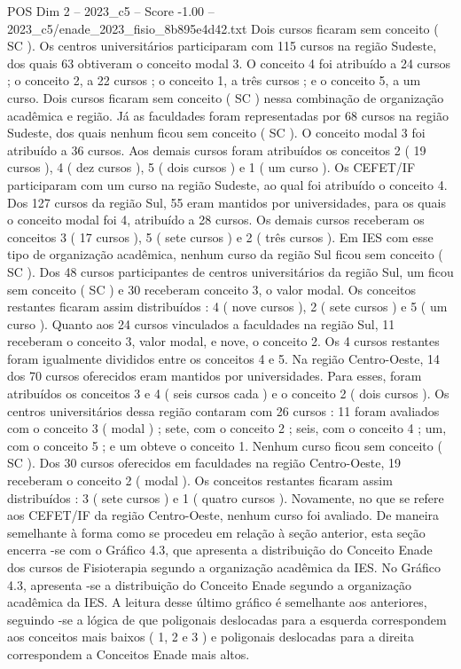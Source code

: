 \begin{textsample}{POS Dim 2 – 2023\_c5 – Score -1.00 – 2023\_c5/enade\_2023\_fisio\_8b895e4d42.txt}
Dois cursos ficaram sem conceito ( SC ).
Os centros universitários participaram com 115 cursos na região Sudeste, dos quais 63 obtiveram o conceito modal 3.
O conceito 4 foi atribuído a 24 cursos ; o conceito 2, a 22 cursos ; o conceito 1, a três cursos ; e o conceito 5, a um curso.
Dois cursos ficaram sem conceito ( SC ) nessa combinação de organização acadêmica e região.
Já as faculdades foram representadas por 68 cursos na região Sudeste, dos quais nenhum ficou sem conceito ( SC ).
O conceito modal 3 foi atribuído a 36 cursos.
Aos demais cursos foram atribuídos os conceitos 2 ( 19 cursos ), 4 ( dez cursos ), 5 ( dois cursos ) e 1 ( um curso ).
Os CEFET/IF participaram com um curso na região Sudeste, ao qual foi atribuído o conceito 4.
Dos 127 cursos da região Sul, 55 eram mantidos por universidades, para os quais o conceito modal foi 4, atribuído a 28 cursos.
Os demais cursos receberam os conceitos 3 ( 17 cursos ), 5 ( sete cursos ) e 2 ( três cursos ).
Em IES com esse tipo de organização acadêmica, nenhum curso da região Sul ficou sem conceito ( SC ).
Dos 48 cursos participantes de centros universitários da região Sul, um ficou sem conceito ( SC ) e 30 receberam conceito 3, o valor modal.
Os conceitos restantes ficaram assim distribuídos : 4 ( nove cursos ), 2 ( sete cursos ) e 5 ( um curso ).
Quanto aos 24 cursos vinculados a faculdades na região Sul, 11 receberam o conceito 3, valor modal, e nove, o conceito 2.
Os 4 cursos restantes foram igualmente divididos entre os conceitos 4 e 5.
Na região Centro-Oeste, 14 dos 70 cursos oferecidos eram mantidos por universidades.
Para esses, foram atribuídos os conceitos 3 e 4 ( seis cursos cada ) e o conceito 2 ( dois cursos ).
Os centros universitários dessa região contaram com 26 cursos : 11 foram avaliados com o conceito 3 ( modal ) ; sete, com o conceito 2 ; seis, com o conceito 4 ; um, com o conceito 5 ; e um obteve o conceito 1.
Nenhum curso ficou sem conceito ( SC ).
Dos 30 cursos oferecidos em faculdades na região Centro-Oeste, 19 receberam o conceito 2 ( modal ).
Os conceitos restantes ficaram assim distribuídos : 3 ( sete cursos ) e 1 ( quatro cursos ).
Novamente, no que se refere aos CEFET/IF da região Centro-Oeste, nenhum curso foi avaliado.
De maneira semelhante à forma como se procedeu em relação à seção anterior, esta seção encerra -se com o Gráfico 4.3, que apresenta a distribuição do Conceito Enade dos cursos de Fisioterapia segundo a organização acadêmica da IES.
No Gráfico 4.3, apresenta -se a distribuição do Conceito Enade segundo a organização acadêmica da IES.
A leitura desse último gráfico é semelhante aos anteriores, seguindo -se a lógica de que poligonais deslocadas para a esquerda correspondem aos conceitos mais baixos ( 1, 2 e 3 ) e poligonais deslocadas para a direita correspondem a Conceitos Enade mais altos.

\end{textsample}
